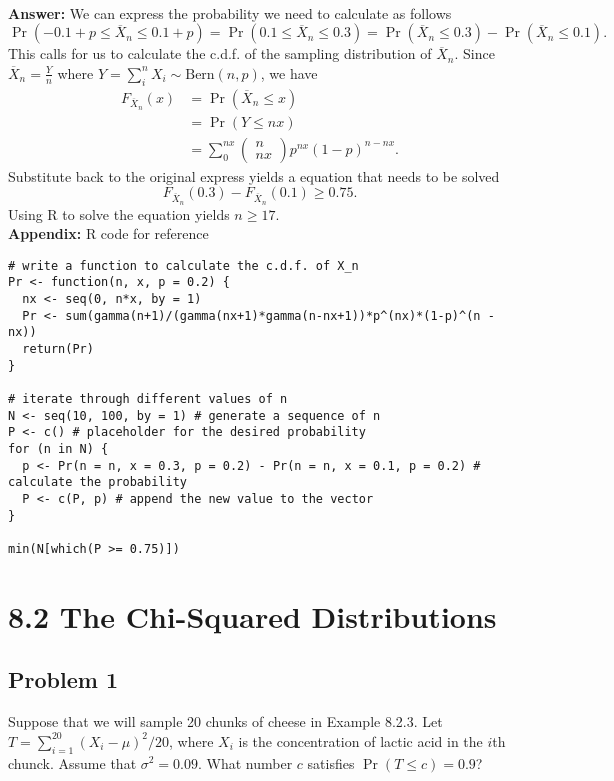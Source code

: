 \documentclass{article}
\begin{document}
\

\textbf{Answer:} We can express the probability we need to calculate as follows
\begin{equation*}
\Pr(-0.1 + p \le \overline{X}_n \le 0.1 + p) = \Pr(0.1 \le \overline{X}_n \le 0.3) = \Pr(\overline{X}_n \le 0.3) - \Pr(\overline{X}_n \le 0.1).
\end{equation*}
This calls for us to calculate the c.d.f. of the sampling distribution of $\overline{X}_n$. Since $\overline{X}_n = \frac{Y}{n}$ where $Y = \sum_i^n X_i \sim \text{Bern}(n, p)$, we have
\begin{align*}
F_{\overline{X}_n}(x) &= \Pr(\overline{X}_n \le x) \\
&= \Pr(Y \le nx) \\
&= \sum_0^{nx} \begin{pmatrix}
n \\
nx
\end{pmatrix} p^{nx} (1-p)^{n-nx}.
\end{align*}
Substitute back to the original express yields a equation that needs to be solved
\begin{equation*}
F_{\overline{X}_n}(0.3) - F_{\overline{X}_n}(0.1) \ge 0.75.
\end{equation*}
Using R to solve the equation yields $n \ge 17$. \\
\textbf{Appendix:} R code for reference
\begin{lstlisting}
# write a function to calculate the c.d.f. of X_n
Pr <- function(n, x, p = 0.2) {
  nx <- seq(0, n*x, by = 1)
  Pr <- sum(gamma(n+1)/(gamma(nx+1)*gamma(n-nx+1))*p^(nx)*(1-p)^(n - nx))
  return(Pr)
}

# iterate through different values of n
N <- seq(10, 100, by = 1) # generate a sequence of n
P <- c() # placeholder for the desired probability
for (n in N) {
  p <- Pr(n = n, x = 0.3, p = 0.2) - Pr(n = n, x = 0.1, p = 0.2) # calculate the probability 
  P <- c(P, p) # append the new value to the vector
}

min(N[which(P >= 0.75)])
\end{lstlisting}

\newpage

\section*{8.2 The Chi-Squared Distributions}
\subsection*{Problem 1}
Suppose that we will sample 20 chunks of cheese in Example 8.2.3. Let $T = \sum_{i=1}^{20} (X_i - \mu)^2/20$, where $X_i$ is the concentration of lactic acid in the $i$th chunck. Assume that $\sigma^2 = 0.09$. What number $c$ satisfies $\Pr(T \le c) = 0.9$?
\end{document}
